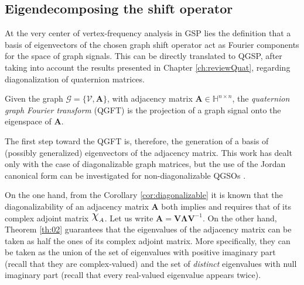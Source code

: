 \subsection{Eigendecomposing the shift operator}
\label{subsec:eigendecomposition}
At the very center of vertex-frequency analysis in GSP lies the definition that a basis of eigenvectors of the chosen graph shift operator act as Fourier components for the space of graph signals. This can be directly translated to QGSP, after taking into account the results presented in Chapter \ref{ch:reviewQuat}, regarding diagonalization of quaternion matrices.

\begin{definition}
    Given the graph $\mathcal{G} = \{\mathcal{V}, \mathbf{A}\}  $,  with adjacency matrix $ \mathbf{A} \in \mathbb{H}^{n \times n}$, the \textit{quaternion graph Fourier transform} (QGFT) is the projection of a graph signal onto the eigenspace of $\mathbf{A}$.
\end{definition}

The first step toward the QGFT is, therefore, the generation of a basis of (possibly generalized) eigenvectors of the adjacency matrix. This work has dealt only with the case of diagonalizable graph matrices, but the use of the Jordan canonical form can be investigated for non-diagonalizable QGSOs \cite{Longxuan1996}.

On the one hand, from the Corollary \ref{cor:diagonalizable} it is known that the diagonalizability of an adjacency matrix $\mathbf{A}$ both implies and requires that of its complex adjoint matrix $\rchi_A$. Let us write $\mathbf{A} = \mathbf{V} \mathbf{\Lambda} \mathbf{V}^{-1}$. On the other hand, Theorem \ref{th:02} guarantees that the eigenvalues of the adjacency matrix can be taken as half the ones of its complex adjoint matrix. More specifically, they can be taken as the union of the set of eigenvalues with positive imaginary part (recall that they are complex-valued) and the set of \textit{distinct} eigenvalues with null imaginary part (recall that every real-valued eigenvalue appears twice).

